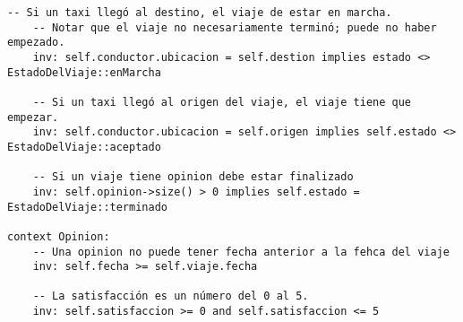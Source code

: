 \begin{lstlisting}[frame=single]
    -- Si un taxi llegó al destino, el viaje de estar en marcha.
    -- Notar que el viaje no necesariamente terminó; puede no haber empezado.
    inv: self.conductor.ubicacion = self.destion implies estado <> EstadoDelViaje::enMarcha

    -- Si un taxi llegó al origen del viaje, el viaje tiene que empezar.
    inv: self.conductor.ubicacion = self.origen implies self.estado <> EstadoDelViaje::aceptado

    -- Si un viaje tiene opinion debe estar finalizado
    inv: self.opinion->size() > 0 implies self.estado = EstadoDelViaje::terminado

context Opinion:
    -- Una opinion no puede tener fecha anterior a la fehca del viaje
    inv: self.fecha >= self.viaje.fecha

    -- La satisfacción es un número del 0 al 5.
    inv: self.satisfaccion >= 0 and self.satisfaccion <= 5

\end{lstlisting}

